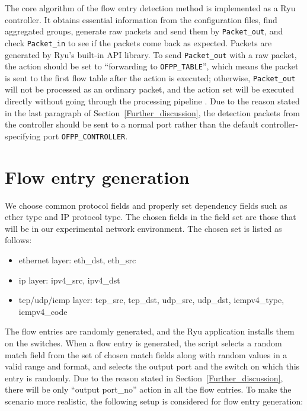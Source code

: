 The core algorithm of the flow entry detection method is implemented as a Ryu controller. It obtains essential information from the configuration files, find aggregated groups, generate raw packets and send them by \texttt{Packet\_out}, and check \texttt{Packet\_in} to see if the packets come back as expected. Packets are generated by Ryu's built-in API library. To send \texttt{Packet\_out} with a raw packet, the action should be set to ``forwarding to \texttt{OFPP\_TABLE}'', which means the packet is sent to the first flow table after the action is executed; otherwise, \texttt{Packet\_out} will not be processed as an ordinary packet, and the action set will be executed directly without going through the processing pipeline \cite{PACKETOUT}. Due to the reason stated in the last paragraph of Section~\ref{Further_discussion}, the detection packets from the controller should be sent to a normal port rather than the default controller-specifying port \texttt{OFPP\_CONTROLLER}. 

\section{Flow entry generation}
\label{flow_entry_generation}
We choose common protocol fields and properly set dependency fields such as ether type and IP protocol type. The chosen fields in the field set are those that will be in our experimental network environment. The chosen set is listed as follows:

\begin{itemize}
\item
ethernet layer: eth\_dst, eth\_src
\item
ip layer: ipv4\_src, ipv4\_dst
\item
tcp/udp/icmp layer: tcp\_src, tcp\_dst, udp\_src, udp\_dst, icmpv4\_type, icmpv4\_code
\end{itemize}

The flow entries are randomly generated, and the Ryu application installs them on the switches. When a flow entry is generated, the script selects a random match field from the set of chosen match fields along with random values in a valid range and format, and selects the output port and the switch on which this entry is randomly. Due to the reason stated in Section~\ref{Further_discussion}, there will be only ``output port\_no'' action in all the flow entries. To make the scenario more realistic, the following setup is considered for flow entry generation:

